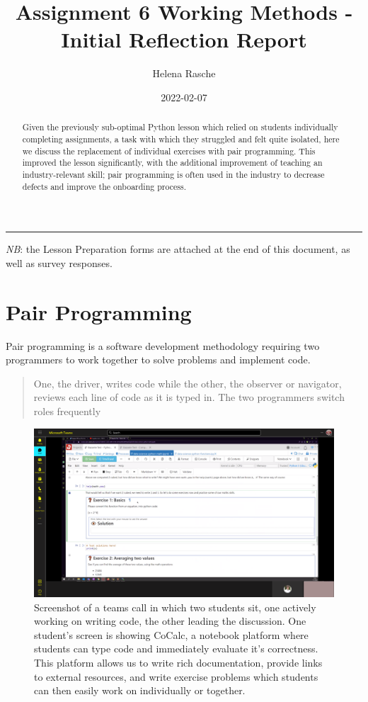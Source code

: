 \documentclass[paper=a4,justified,a4paper]{tufte-handout}
\title[]{Assignment 6 Working Methods - Initial Reflection Report}
\author{Helena Rasche}
\date{2022-02-07}
\begin{document}
\maketitle
\begin{abstract}
Given the previously sub-optimal Python lesson which relied on students
individually completing assignments, a task with which they struggled
and felt quite isolated, here we discuss the replacement of individual
exercises with pair programming. This improved the lesson significantly,
with the additional improvement of teaching an industry-relevant skill;
pair programming is often used in the industry to decrease defects and
improve the onboarding process.
\end{abstract}
\noindent\rule{5in}{0.4pt}


\emph{NB}: the Lesson Preparation forms are attached at the end of this
document, as well as survey responses.

\hypertarget{pair-programming}{%
\section{Pair Programming}\label{pair-programming}}

Pair programming is a software development methodology requiring two
programmers to work together to solve problems and implement code.

\begin{quote}
One, the driver, writes code while the other, the observer or navigator,
reviews each line of code as it is typed in. The two programmers switch
roles frequently \citep{Williams}
\end{quote}

\begin{figure}
\centering
\includegraphics{sharing.png}
\caption{Screenshot of a teams call in which two students sit, one
actively working on writing code, the other leading the discussion. One
student's screen is showing CoCalc, a notebook platform where students
can type code and immediately evaluate it's correctness. This platform
allows us to write rich documentation, provide links to external
resources, and write exercise problems which students can then easily
work on individually or together.}
\end{figure}
\end{document}
